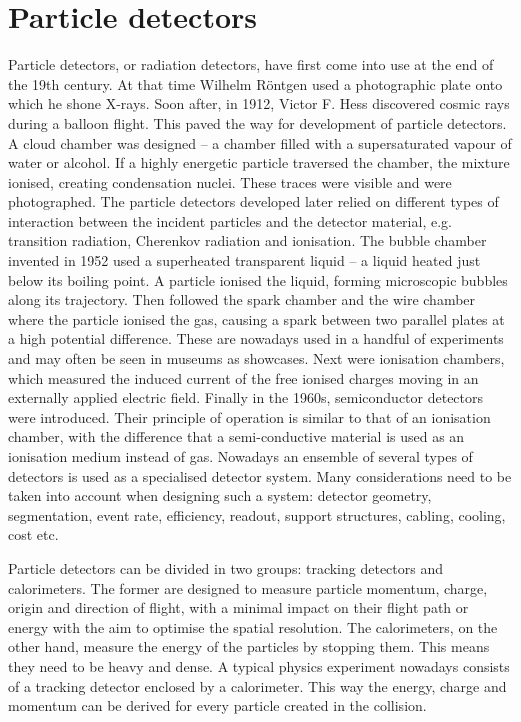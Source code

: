 \section{Particle detectors}
Particle detectors, or radiation detectors, have first come into use at the end of the 19th century. At that time Wilhelm R\"ontgen used a photographic plate onto which he shone X-rays. Soon after, in 1912, Victor F. Hess discovered cosmic rays during a balloon flight. This paved the way for development of particle detectors. A cloud chamber was designed -- a chamber filled with a supersaturated vapour of water or alcohol. If a highly energetic particle traversed the chamber, the mixture ionised, creating condensation nuclei. These traces were visible and were photographed. The particle detectors developed later relied on different types of interaction between the incident particles and the detector material, e.g. transition radiation, Cherenkov radiation and ionisation. The bubble chamber invented in 1952 used a superheated transparent liquid -- a liquid heated just below its boiling point. A particle ionised the liquid, forming microscopic bubbles along its trajectory. Then followed the spark chamber and the wire chamber where the particle ionised the gas, causing a spark between two parallel plates at a high potential difference. These are nowadays used in a handful of experiments and may often be seen in museums as showcases. Next were ionisation chambers, which measured the induced current of the free ionised charges moving in an externally applied electric field. Finally in the 1960s, semiconductor detectors were introduced. Their principle of operation is similar to that of an ionisation chamber, with the difference that a semi-conductive material is used as an ionisation medium instead of gas. Nowadays an ensemble of several types of detectors is used as a specialised detector system. Many considerations need to be taken into account when designing such a system: detector geometry, segmentation, event rate, efficiency, readout, support structures, cabling, cooling, cost etc.

Particle detectors can be divided in two groups: tracking detectors and calorimeters. The former are designed to measure  particle momentum, charge, origin and direction of flight, with a minimal impact on their flight path or energy with the aim to optimise the spatial resolution. The calorimeters, on the other hand, measure the energy of the particles by stopping them. This means they need to be heavy and dense. A typical physics experiment nowadays consists of a tracking detector enclosed by a calorimeter. This way the energy, charge and momentum can be derived for every particle created in the collision.

